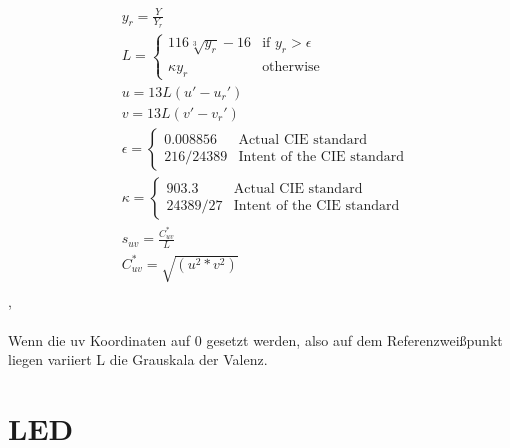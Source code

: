 \documentclass[11pt]{scrartcl}
\begin{document}
\begin{align}\label{Equ:10}
    &y_r = \frac{Y}{Y_r}\\
    &L = \left\{
        \begin{array}{ll}
            116 \sqrt[3]{y_r} - 16 & \text{if } y_r > \epsilon \\
            \kappa y_r & \text{otherwise}
        \end{array}
        \right.\\
    &u = 13 L (u' - u_r')\\
    &v = 13 L (v' - v_r')\\
    &\epsilon = \left\{
        \begin{array}{ll}
            {0.008856} & \text{Actual CIE standard} \\
            {216 / 24389} & \text{Intent of the CIE standard}
        \end{array}
        \right.\\
    &\kappa = \left\{
        \begin{array}{ll}
            {903.3} & \text{Actual CIE standard} \\
            {24389 / 27} & \text{Intent of the CIE standard}
        \end{array}
        \right.\\
    &s_{uv} = \frac{C^*_{uv}}{L}\\
    &C^*_{uv} = \sqrt{(u^2*v^2)}\\
\end{align}
\cite{lindbloom}, \cite{wikipedia1976}\\
\\
Wenn die uv Koordinaten auf 0 gesetzt werden, also auf dem Referenzweißpunkt liegen variiert L die Grauskala der Valenz. \cite{wisotoLuv}
\clearpage

\section{LED}
\end{document}
